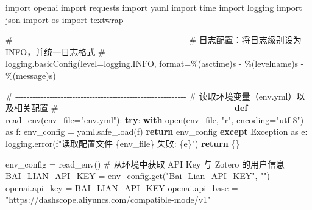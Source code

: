 \documentclass[
  letterpaper,
  DIV=11,
  numbers=noendperiod]{scrreprt}
\newenvironment{Shaded}{\begin{snugshade}}{\end{snugshade}}
\newcommand{\BuiltInTok}[1]{\textcolor[rgb]{0.00,0.23,0.31}{#1}}
\newcommand{\CommentTok}[1]{\textcolor[rgb]{0.37,0.37,0.37}{#1}}
\newcommand{\ControlFlowTok}[1]{\textcolor[rgb]{0.00,0.23,0.31}{\textbf{#1}}}
\newcommand{\ImportTok}[1]{\textcolor[rgb]{0.00,0.46,0.62}{#1}}
\newcommand{\KeywordTok}[1]{\textcolor[rgb]{0.00,0.23,0.31}{\textbf{#1}}}
\newcommand{\NormalTok}[1]{\textcolor[rgb]{0.00,0.23,0.31}{#1}}
\newcommand{\OperatorTok}[1]{\textcolor[rgb]{0.37,0.37,0.37}{#1}}
\newcommand{\PreprocessorTok}[1]{\textcolor[rgb]{0.68,0.00,0.00}{#1}}
\newcommand{\SpecialCharTok}[1]{\textcolor[rgb]{0.37,0.37,0.37}{#1}}
\newcommand{\SpecialStringTok}[1]{\textcolor[rgb]{0.13,0.47,0.30}{#1}}
\newcommand{\StringTok}[1]{\textcolor[rgb]{0.13,0.47,0.30}{#1}}
\begin{document}
\begin{Shaded}
\begin{Highlighting}[]
\ImportTok{import}\NormalTok{ openai}
\ImportTok{import}\NormalTok{ requests}
\ImportTok{import}\NormalTok{ yaml}
\ImportTok{import}\NormalTok{ time}
\ImportTok{import}\NormalTok{ logging}
\ImportTok{import}\NormalTok{ json}
\ImportTok{import}\NormalTok{ os}
\ImportTok{import}\NormalTok{ textwrap}

\CommentTok{\# {-}{-}{-}{-}{-}{-}{-}{-}{-}{-}{-}{-}{-}{-}{-}{-}{-}{-}{-}{-}{-}{-}{-}{-}{-}{-}{-}{-}{-}{-}{-}{-}{-}{-}{-}{-}{-}{-}{-}{-}{-}{-}{-}{-}{-}{-}{-}{-}{-}{-}{-}{-}{-}{-}{-}{-}{-}{-}{-}{-}}
\CommentTok{\# 日志配置：将日志级别设为 INFO，并统一日志格式}
\CommentTok{\# {-}{-}{-}{-}{-}{-}{-}{-}{-}{-}{-}{-}{-}{-}{-}{-}{-}{-}{-}{-}{-}{-}{-}{-}{-}{-}{-}{-}{-}{-}{-}{-}{-}{-}{-}{-}{-}{-}{-}{-}{-}{-}{-}{-}{-}{-}{-}{-}{-}{-}{-}{-}{-}{-}{-}{-}{-}{-}{-}{-}}
\NormalTok{logging.basicConfig(level}\OperatorTok{=}\NormalTok{logging.INFO, }\BuiltInTok{format}\OperatorTok{=}\StringTok{\textquotesingle{}}\SpecialCharTok{\%(asctime)s}\StringTok{ {-} }\SpecialCharTok{\%(levelname)s}\StringTok{ {-} }\SpecialCharTok{\%(message)s}\StringTok{\textquotesingle{}}\NormalTok{)}

\CommentTok{\# {-}{-}{-}{-}{-}{-}{-}{-}{-}{-}{-}{-}{-}{-}{-}{-}{-}{-}{-}{-}{-}{-}{-}{-}{-}{-}{-}{-}{-}{-}{-}{-}{-}{-}{-}{-}{-}{-}{-}{-}{-}{-}{-}{-}{-}{-}{-}{-}{-}{-}{-}{-}{-}{-}{-}{-}{-}{-}{-}{-}}
\CommentTok{\# 读取环境变量（env.yml）以及相关配置}
\CommentTok{\# {-}{-}{-}{-}{-}{-}{-}{-}{-}{-}{-}{-}{-}{-}{-}{-}{-}{-}{-}{-}{-}{-}{-}{-}{-}{-}{-}{-}{-}{-}{-}{-}{-}{-}{-}{-}{-}{-}{-}{-}{-}{-}{-}{-}{-}{-}{-}{-}{-}{-}{-}{-}{-}{-}{-}{-}{-}{-}{-}{-}}
\KeywordTok{def}\NormalTok{ read\_env(env\_file}\OperatorTok{=}\StringTok{"env.yml"}\NormalTok{):}
    \ControlFlowTok{try}\NormalTok{:}
        \ControlFlowTok{with} \BuiltInTok{open}\NormalTok{(env\_file, }\StringTok{"r"}\NormalTok{, encoding}\OperatorTok{=}\StringTok{"utf{-}8"}\NormalTok{) }\ImportTok{as}\NormalTok{ f:}
\NormalTok{            env\_config }\OperatorTok{=}\NormalTok{ yaml.safe\_load(f)}
            \ControlFlowTok{return}\NormalTok{ env\_config}
    \ControlFlowTok{except} \PreprocessorTok{Exception} \ImportTok{as}\NormalTok{ e:}
\NormalTok{        logging.error(}\SpecialStringTok{f"读取配置文件 }\SpecialCharTok{\{}\NormalTok{env\_file}\SpecialCharTok{\}}\SpecialStringTok{ 失败: }\SpecialCharTok{\{}\NormalTok{e}\SpecialCharTok{\}}\SpecialStringTok{"}\NormalTok{)}
        \ControlFlowTok{return}\NormalTok{ \{\}}

\NormalTok{env\_config }\OperatorTok{=}\NormalTok{ read\_env()}
\CommentTok{\# 从环境中获取 API Key 与 Zotero 的用户信息}
\NormalTok{BAI\_LIAN\_API\_KEY }\OperatorTok{=}\NormalTok{ env\_config.get(}\StringTok{"Bai\_Lian\_API\_KEY"}\NormalTok{, }\StringTok{""}\NormalTok{)}
\NormalTok{openai.api\_key }\OperatorTok{=}\NormalTok{ BAI\_LIAN\_API\_KEY}
\NormalTok{openai.api\_base }\OperatorTok{=} \StringTok{"https://dashscope.aliyuncs.com/compatible{-}mode/v1"}


\end{Highlighting}
\end{Shaded}
\end{document}
